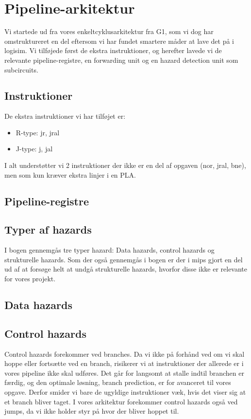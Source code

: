 \section{Pipeline-arkitektur}

Vi startede ud fra vores enkeltcyklusarkitektur fra G1, som vi dog har omstruktureret en del
eftersom vi har fundet smartere måder at lave det på i logisim. Vi tilføjede først de ekstra
instruktioner, og herefter lavede vi de relevante pipeline-registre, en forwarding unit og 
en hazard detection unit som subcircuits.  

\subsection{Instruktioner}
De ekstra instruktioner vi har tilføjet er:
\begin{itemize}
\item R-type: jr, jral
\item J-type: j, jal
\end{itemize}

I alt understøtter vi 2 instruktioner der ikke er en del af opgaven (nor, jral, bne), men som kun kræver ekstra
linjer i en PLA. 

\subsection{Pipeline-registre}

\subsection{Typer af hazards}
I bogen gennemgås tre typer hazard: Data hazards, control hazards og
strukturelle hazards. Som der også gennemgås i bogen er der i mips gjort en del
ud af at forsøge helt at undgå strukturelle hazards, hvorfor disse ikke er
relevante for vores projekt.

\subsection{Data hazards}

\subsection{Control hazards}
Control hazards forekommer ved branches. Da vi ikke på forhånd ved om vi skal hoppe
eller fortsætte ved en branch, risikerer vi at instruktioner der allerede er i vores
pipeline ikke skal udføres. Det går for langsomt at stalle indtil branchen er færdig,
og den optimale løsning, branch prediction, er for avanceret til vores opgave. Derfor
smider vi bare de ugyldige instruktioner væk, hvis det viser sig at et branch bliver taget.
I vores arkitektur forekommer control hazards også ved jumps, da vi ikke holder styr på hvor
der bliver hoppet til.

